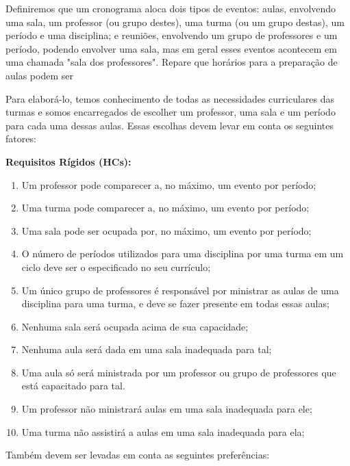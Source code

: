 \documentclass[12pt,a4paper]{article}
\begin{document}

			\par Definiremos que um cronograma aloca dois tipos de eventos: aulas, envolvendo uma sala, um professor (ou grupo destes), uma turma (ou um grupo destas), um período e uma disciplina; e reuniões, envolvendo um grupo de professores e um período, podendo envolver uma sala, mas em geral esses eventos acontecem em uma chamada "sala dos professores". Repare que horários para a preparação de aulas podem ser

			\par Para elaborá-lo, temos conhecimento de todas as necessidades curriculares das turmas e somos encarregados de escolher um professor, uma sala e um período para cada uma dessas aulas. Essas escolhas devem levar em conta os seguintes fatores:

			\textbf{Requisitos Rígidos (HCs):}
			\begin{enumerate}
				\item Um professor pode comparecer a, no máximo, um evento por período;
				\item Uma turma pode comparecer a, no máximo, um evento por período;
				\item Uma sala pode ser ocupada por, no máximo, um evento por período;
				\item O número de períodos utilizados para uma disciplina por uma turma em um ciclo deve ser o especificado no seu currículo;
				\item Um único grupo de professores é responsável por ministrar as aulas de uma disciplina para uma turma, e deve se fazer presente em todas essas aulas;
				\item Nenhuma sala será ocupada acima de sua capacidade;
				\item Nenhuma aula será dada em uma sala inadequada para tal;
				\item Uma aula só será ministrada por um professor ou grupo de professores que está capacitado para tal.
				\item Um professor não ministrará aulas em uma sala inadequada para ele;
				\item Uma turma não assistirá a aulas em uma sala inadequada para ela;
			\end{enumerate}

			\par Também devem ser levadas em conta as seguintes preferências:
\end{document}
